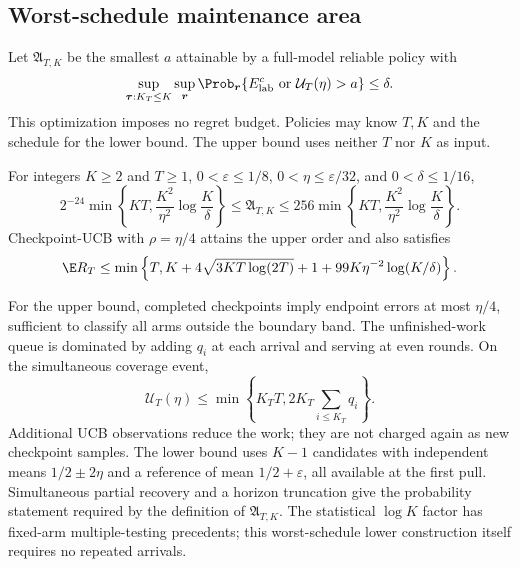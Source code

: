 \subsection{Worst-schedule maintenance area}

Let $\mathfrak A_{T,K}$ be the smallest $a$ attainable by a full-model reliable
policy with
\[
 \sup_{\boldsymbol\tau:K_T\le K}\sup_{\boldsymbol r}
 \Prob_{\boldsymbol r}\{E_{\rm lab}^c\ \text{or}\ \mathcal U_T(\eta)>a\}\le\delta.
\]
This optimization imposes no regret budget. Policies may know $T,K$ and the
schedule for the lower bound. The upper bound uses neither $T$ nor $K$ as
input.

\begin{theorem}
\label{thm:worst_area}
For integers $K\ge2$ and $T\ge1$, $0<\varepsilon\le1/8$,
$0<\eta\le\varepsilon/32$, and $0<\delta\le1/16$,
\begin{equation}
 2^{-24}\min\left\{KT,\frac{K^2}{\eta^2}\log\frac K\delta\right\}
 \le\mathfrak A_{T,K}\le
 256\min\left\{KT,\frac{K^2}{\eta^2}\log\frac K\delta\right\}.
 \label{eq:worst_area}
\end{equation}
Checkpoint-UCB with $\rho=\eta/4$ attains the upper order and also satisfies
\begin{equation}
 \E R_T\le\min\left\{T,K+4\sqrt{3KT\log(2T)}+1+
                         99K\eta^{-2}\log(K/\delta)\right\}.
 \label{eq:joint_general}
\end{equation}
\end{theorem}

For the upper bound, completed checkpoints imply endpoint errors at most
$\eta/4$, sufficient to classify all arms outside the boundary band. The
unfinished-work queue is dominated by adding $q_i$ at each arrival and serving
at even rounds. On the simultaneous coverage event,
\begin{equation}
 \mathcal U_T(\eta)\le\min\left\{K_TT,
                         2K_T\sum_{i\le K_T}q_i\right\}.
 \label{eq:queue_upper}
\end{equation}
Additional UCB observations reduce the work; they are not charged again as
new checkpoint samples. The lower bound uses $K-1$ candidates with independent
means $1/2\pm2\eta$ and a reference of mean $1/2+\varepsilon$, all available
at the first pull. Simultaneous partial recovery and a horizon truncation give
the probability statement required by the definition of $\mathfrak A_{T,K}$.
The statistical $\log K$ factor has fixed-arm multiple-testing precedents;
this worst-schedule lower construction itself requires no repeated arrivals.

